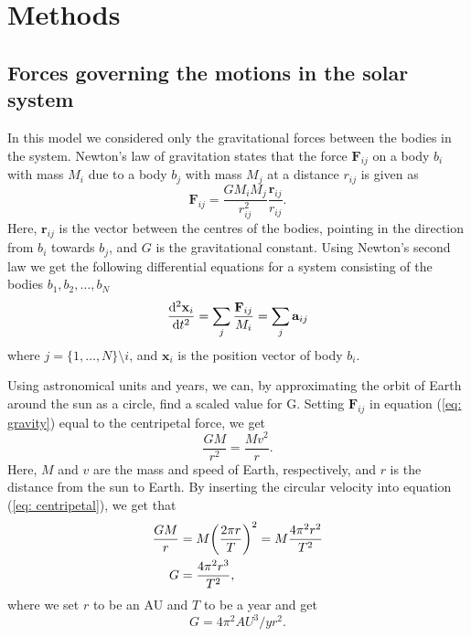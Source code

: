 \section{Methods}
\label{sec:methods}

\subsection{Forces governing the motions in the solar system}
In this model we considered only the gravitational forces between the bodies in the system. Newton's law of gravitation states that the force $\mathbf{F}_{ij}$ on a body $b_i$ with mass $M_i$ due to a body $b_j$ with mass $M_j$ at a distance $r_{ij}$ is given as
\begin{equation}\label{eq: gravity}
	\mathbf{F}_{ij} = \frac{GM_iM_j}{r_{ij}^2}\frac{\mathbf{r}_{ij}}{r_{ij}}.
\end{equation}
Here, $\mathbf{r}_{ij}$ is the vector between the centres of the bodies, pointing in the direction from $b_i$ towards $b_j$, and $G$ is the gravitational constant. Using Newton's second law we get the following differential equations for a system consisting of the bodies $b_1,b_2,\ldots,b_N$
\begin{equation}\label{eq:diff}
	\dv[2]{\mathbf{x}_i}{t} = \sum_j \frac{\mathbf{F}_{ij}}{M_i} = \sum_j \mathbf{a}_{ij}
\end{equation}
where $j = \{1,\ldots,N\}\setminus i$, and $\mathbf{x}_i$ is the position vector of body $b_i$.

Using astronomical units and years, we can, by approximating the orbit of Earth around the sun as a circle, find a scaled value for G. Setting $\mathbf{F}_{ij}$ in equation (\ref{eq: gravity}) equal to the centripetal force, we get
\begin{equation}\label{eq: centripetal}
	\frac{GM}{r^2} = \frac{Mv^2}{r}.
\end{equation}
Here, $M$ and $v$ are the mass and speed of Earth, respectively, and $r$ is the distance from the sun to Earth. By inserting the circular velocity into equation (\ref{eq: centripetal}), we get that
 \begin{align}
	 \frac{GM}{r} &= M\qty(\frac{2\pi r}{T})^2 = M\frac{4 \pi^2 r^2}{T^2} \\
	 G &= \frac{4 \pi^2 r^3}{T^2},
 \end{align}
where we set $r$ to be an AU and $T$ to be a year and get
 \begin{equation}
	 G = 4 \pi ^2 AU^3/yr^2.
 \end{equation}

